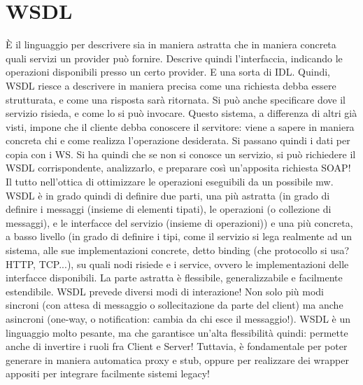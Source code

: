 \section{WSDL}
È il linguaggio per descrivere sia in maniera astratta che in maniera concreta quali servizi un provider può fornire.
Descrive quindi l'interfaccia, indicando le operazioni disponibili presso un certo provider. E una sorta di IDL.
Quindi, WSDL riesce a descrivere in maniera precisa come una richiesta debba essere strutturata, e come una risposta
sarà ritornata. Si può anche specificare dove il servizio risieda, e come lo si può invocare.
Questo sistema, a differenza di altri già visti, impone che il cliente debba conoscere il servitore: viene a sapere in
maniera concreta chi e come realizza l'operazione desiderata. Si passano quindi i dati per copia con i WS. Si ha quindi
che se non si conosce un servizio, si può richiedere il WSDL corrispondente, analizzarlo, e preparare così un'apposita
richiesta SOAP! Il tutto nell'ottica di ottimizzare le operazioni eseguibili da un possibile mw.
WSDL è in grado quindi di definire due parti, una più astratta (in grado di definire i messaggi (insieme di elementi
tipati), le operazioni (o collezione di messaggi), e le interfacce del servizio (insieme di operazioni)) e una più
concreta, a basso livello (in grado di definire i tipi, come il servizio si lega realmente ad un sistema, alle sue
implementazioni concrete, detto binding (che protocollo si usa? HTTP, TCP...), su quali nodi risiede e i service,
ovvero le implementazioni delle interfacce disponibili. La parte astratta è flessibile, generalizzabile e facilmente
estendibile.
WSDL prevede diversi modi di interazione! Non solo più modi sincroni (con attesa di messaggio o sollecitazione da
parte del client) ma anche asincroni (one-way, o notification: cambia da chi esce il messaggio!).
WSDL è un linguaggio molto pesante, ma che garantisce un'alta flessibilità quindi: permette anche di invertire i ruoli
fra Client e Server! Tuttavia, è fondamentale per poter generare in maniera automatica proxy e stub, oppure per realizzare
dei wrapper appositi per integrare facilmente sistemi legacy!
